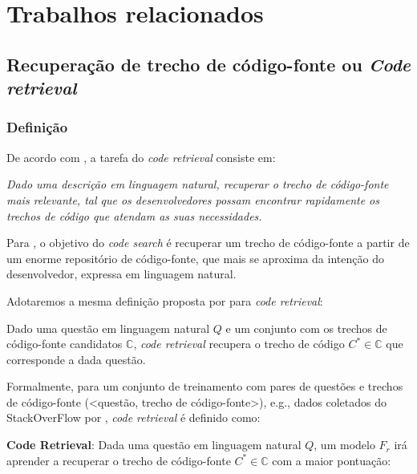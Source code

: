 \chapter{Trabalhos relacionados}
\label{cap:trabalhos-relacionados}



\section{Recuperação de trecho de código-fonte ou \textit{Code retrieval}}
\label{sec:code-retrieval}

\subsection{Definição}\label{sec:code-retrieval-definicao}
De acordo com \cite{Chen-bi-variational-autoencoder:2018}, a tarefa do \textit{code retrieval} consiste em:

\emph{Dado uma descrição em linguagem natural, recuperar o trecho de código-fonte mais relevante, tal que os desenvolvedores possam encontrar rapidamente os trechos de código que atendam as suas necessidades.}

Para \cite{cambronero-deep-learning-code-search:2019}, o objetivo do \textit{code search} é recuperar um trecho de código-fonte a partir de um enorme repositório de código-fonte, que mais se aproxima da intenção do desenvolvedor, expressa em linguagem natural. 

Adotaremos a mesma definição proposta por \cite{iyer-etal-2016-summarizing, Yao-coacor:2019} para \textit{code retrieval}:

Dado uma questão em linguagem natural $Q$ e um conjunto com os trechos de código-fonte candidatos $\mathbb{C}$, \textit{code retrieval} recupera o trecho de código $C^{*} \in \mathbb{C}$ que corresponde a dada questão.

Formalmente, para um conjunto de treinamento com pares de questões e trechos de código-fonte (<questão, trecho de código-fonte>), e.g., dados coletados do StackOverFlow por \cite{yao-2018}, \textit{code retrieval} é definido como:

\textbf{Code Retrieval}: Dada uma questão em linguagem natural $Q$, um modelo $F_{r}$ irá aprender a recuperar o trecho de código-fonte $C^{*} \in \mathbb{C}$ com a maior pontuação:

